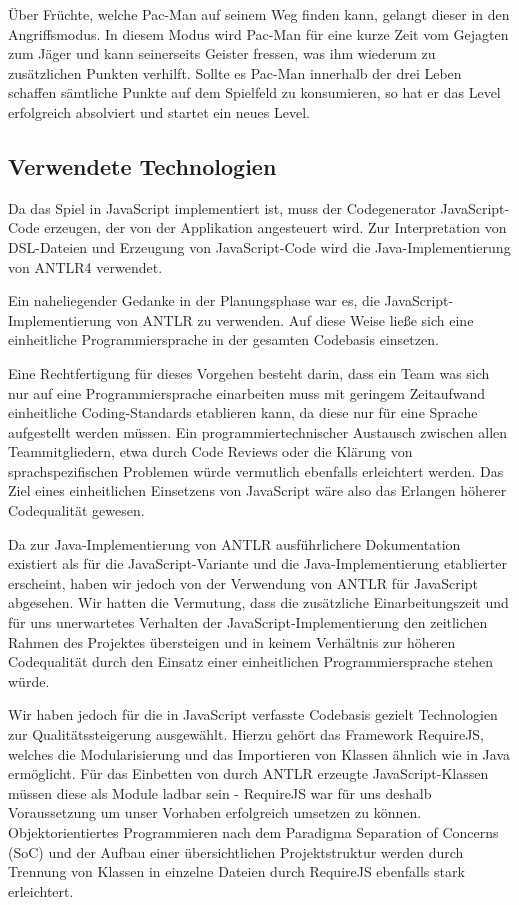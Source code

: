 \documentclass[conference]{IEEEtran}
\begin{document}
Über Früchte, welche Pac-Man auf seinem Weg finden kann, gelangt dieser in den Angriffsmodus. In diesem Modus wird Pac-Man für eine kurze Zeit vom Gejagten zum Jäger und kann seinerseits Geister fressen, was ihm wiederum zu zusätzlichen Punkten verhilft. Sollte es Pac-Man innerhalb der drei Leben schaffen sämtliche Punkte auf dem Spielfeld zu konsumieren, so hat er das Level erfolgreich absolviert und startet ein neues Level.



\subsection{Verwendete Technologien}
Da das Spiel in JavaScript implementiert ist, muss der Codegenerator JavaScript-Code erzeugen, der von der Applikation angesteuert wird. Zur Interpretation von DSL-Dateien und Erzeugung von JavaScript-Code wird die Java-Implementierung von ANTLR4 verwendet.

Ein naheliegender Gedanke in der Planungsphase war es, die JavaScript-Implementierung von ANTLR zu verwenden. Auf diese Weise ließe sich eine einheitliche Programmiersprache in der gesamten Codebasis  einsetzen.

Eine Rechtfertigung für dieses Vorgehen besteht darin, dass ein Team was sich nur auf eine Programmiersprache einarbeiten muss mit geringem Zeitaufwand einheitliche Coding-Standards etablieren kann, da diese nur für eine Sprache aufgestellt werden müssen.  Ein programmiertechnischer Austausch zwischen allen Teammitgliedern,  etwa durch Code Reviews oder die Klärung von sprachspezifischen  Problemen würde vermutlich ebenfalls erleichtert werden. Das Ziel eines einheitlichen Einsetzens von JavaScript wäre also das Erlangen höherer Codequalität gewesen.

Da zur Java-Implementierung von ANTLR ausführlichere Dokumentation existiert als für die JavaScript-Variante und die Java-Implementierung etablierter erscheint, haben wir jedoch von der Verwendung von ANTLR für JavaScript abgesehen. Wir hatten die Vermutung, dass die zusätzliche Einarbeitungszeit und für uns unerwartetes Verhalten der JavaScript-Implementierung den zeitlichen Rahmen des Projektes übersteigen und in keinem Verhältnis zur  höheren Codequalität durch den Einsatz einer einheitlichen Programmiersprache stehen würde.

Wir haben jedoch für die in JavaScript verfasste Codebasis gezielt Technologien zur Qualitätssteigerung ausgewählt. Hierzu gehört das Framework RequireJS, welches die Modularisierung und das Importieren von Klassen ähnlich wie in Java ermöglicht. Für das Einbetten von durch ANTLR erzeugte JavaScript-Klassen müssen diese als Module ladbar sein - RequireJS war für uns deshalb Voraussetzung um unser  Vorhaben erfolgreich umsetzen zu können. Objektorientiertes Programmieren nach dem Paradigma Separation of Concerns (SoC) und der Aufbau einer übersichtlichen Projektstruktur werden durch Trennung von Klassen in einzelne Dateien durch RequireJS ebenfalls stark erleichtert.
\end{document}
